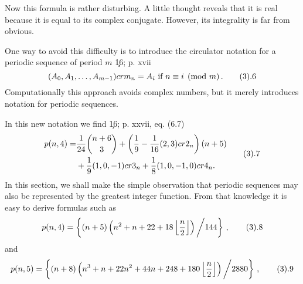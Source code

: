 Now this formula is rather disturbing.  A little thought reveals that
it is real because it is equal to its complex conjugate.  However, its
integrality is far from obvious.

One way to avoid this difficulty is to introduce the circulator
notation for a periodic sequence of period $m$ \c{16; p. xvii}
$$
	(A_0,A_1,\dots,A_{m-1}) crm_n = A_i \text{ if } 
	n \equiv i \pmod{m}\,.
\tag3.6
$$
Computationally this approach avoids complex numbers, but it merely
introduces notation for periodic sequences.

In this new notation we find \c{16; p. xxvii, eq. (6.7)}
$$
\aligned
	p(n,4) = & \fr1{24}  \binom{n+6}{3} + \left(\fr1{9} - \fr1{16}
	(2,3) cr 2_n\right) (n + 5)  \\
	& + \fr1{9} (1,0,-1) cr 3_n + \fr1{8} (1,0,-1,0) cr 4_n.
\endaligned
\tag3.7
$$
In this section, we shall make the simple observation
that periodic sequences may also be represented by the greatest 
integer function.  From that knowledge it is easy to derive formulas
such as
$$
	p(n,4) = \left\{(n + 5)\left(n^2 + n+ 22 + 18 \left\lfloor
	\fr{n}{2}\right\rfloor\right)\bigg/144 \right\}\,,
\tag3.8
$$
and
$$
	p(n,5) = \left\{(n + 8)\left(n^3 + n+ 22n^2 + 44n + 248 +
	180 \left\lfloor
	\fr{n}{2}\right\rfloor\right)\bigg/2880 \right\}\,,
\tag3.9
$$

